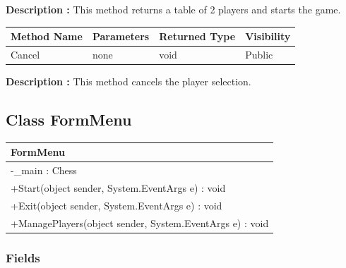 \documentclass[12pt]{article}
\begin{document}
    \textbf{Description :} This method returns a table of 2 players and starts the game.

    \begin{table}[H]
        \begin{tabular}{|l|l|l|l|}
            \hline
            \rowcolor[HTML]{EFEFEF}
            \cellcolor[HTML]{EFEFEF}\textbf{Method Name} & \textbf{Parameters} & \textbf{Returned Type} & \textbf{Visibility} \\ \hline
            Cancel                                       & none                & void                   & Public              \\ \hline
        \end{tabular}
    \end{table}

    \textbf{Description :} This method cancels the player selection.

    \newpage


    \subsection{Class FormMenu}

    \begin{table}[H]
        \begin{tabular}{|l|}
            \hline
            \rowcolor[HTML]{C0C0C0}
            \textbf{FormMenu}                                        \\ \hline
            \rowcolor[HTML]{EFEFEF}
            -\_main : Chess                                          \\ \hline
            \rowcolor[HTML]{FFFFFF}
            +Start(object sender, System.EventArgs e) : void         \\ \hline
            \rowcolor[HTML]{FFFFFF}
            +Exit(object sender, System.EventArgs e) : void          \\ \hline
            \rowcolor[HTML]{FFFFFF}
            +ManagePlayers(object sender, System.EventArgs e) : void \\ \hline
        \end{tabular}
    \end{table}

    \subsubsection{Fields}
\end{document}
